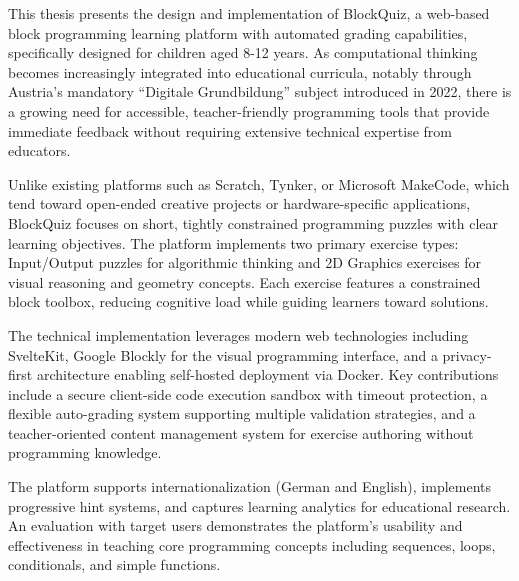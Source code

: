 This thesis presents the design and implementation of BlockQuiz, a web-based block programming learning platform with
automated grading capabilities, specifically designed for children aged 8-12 years.
As computational thinking becomes increasingly integrated into educational curricula,
notably through Austria's mandatory ``Digitale Grundbildung'' subject introduced in 2022,
there is a growing need for accessible, teacher-friendly programming tools that provide immediate feedback
without requiring extensive technical expertise from educators.

Unlike existing platforms such as Scratch, Tynker, or Microsoft MakeCode, which tend toward
open-ended creative projects or hardware-specific applications, BlockQuiz focuses on short,
tightly constrained programming puzzles with clear learning objectives.
The platform implements two primary exercise types: Input/Output puzzles for algorithmic
thinking and 2D Graphics exercises for visual reasoning and geometry concepts.
Each exercise features a constrained block toolbox, reducing cognitive load while guiding learners toward solutions.

The technical implementation leverages modern web technologies including SvelteKit,
Google Blockly for the visual programming interface, and a privacy-first architecture
enabling self-hosted deployment via Docker. Key contributions include a secure client-side
code execution sandbox with timeout protection, a flexible auto-grading system supporting multiple
validation strategies, and a teacher-oriented content management system for exercise authoring without programming knowledge.

The platform supports internationalization (German and English), implements progressive hint systems,
and captures learning analytics for educational research. An evaluation with target users demonstrates
the platform's usability and effectiveness in teaching core programming concepts including sequences,
loops, conditionals, and simple functions.
